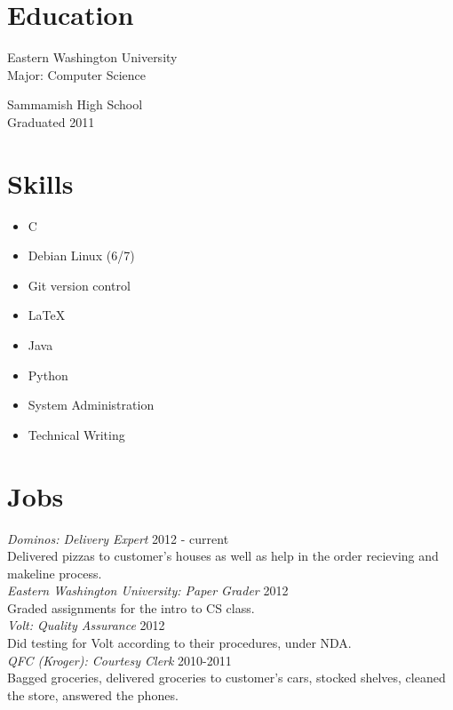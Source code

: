 \documentclass[line, margin, 12pt]{res}
\begin{document}
\address{12924 SE 26th ST \\ Bellevue WA, 98005 \\ +1 (425) 221-7761}
     
\begin{resume}
\section{Education}
Eastern Washington University \\
Major: Computer Science

Sammamish High School \\
Graduated 2011
     
\section{Skills}
\begin{itemize}
\item C
\item Debian Linux (6/7)
\item Git version control
\item \LaTeX
\item Java
\item Python
\item System Administration
\item Technical Writing
\end{itemize}
     
\section{Jobs}
\textit{Dominos: Delivery Expert} \hfill 2012 - current \\
Delivered pizzas to customer's houses as well as help in the order
recieving and makeline process. \\ [10pt]
\textit{Eastern Washington University: Paper Grader} \hfill 2012 \\
Graded assignments for the intro to CS class. \\ [10pt]
\textit{Volt: Quality Assurance} \hfill 2012 \\
Did testing for Volt according to their procedures, under NDA. \\ [10pt]
\textit{QFC (Kroger): Courtesy Clerk} \hfill 2010-2011 \\
Bagged groceries, delivered groceries to customer's cars, stocked
shelves, cleaned the store, answered the phones. \\ [10pt]


\end{resume}
\end{document}
